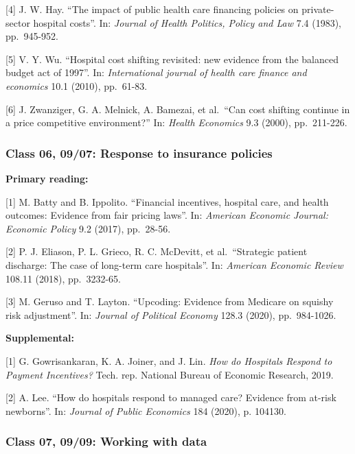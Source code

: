 \documentclass[11pt,]{article}
\begin{document}
{[}4{]} J. W. Hay. ``The impact of public health care financing policies
on private-sector hospital costs''. In: \emph{Journal of Health
Politics, Policy and Law} 7.4 (1983), pp.~945-952.

{[}5{]} V. Y. Wu. ``Hospital cost shifting revisited: new evidence from
the balanced budget act of 1997''. In: \emph{International journal of
health care finance and economics} 10.1 (2010), pp.~61-83.

{[}6{]} J. Zwanziger, G. A. Melnick, A. Bamezai, et al.~``Can cost
shifting continue in a price competitive environment?'' In: \emph{Health
Economics} 9.3 (2000), pp.~211-226.

\hypertarget{class-06-0907-response-to-insurance-policies}{%
\subsubsection{Class 06, 09/07: Response to insurance
policies}\label{class-06-0907-response-to-insurance-policies}}

\textbf{Primary reading:}

{[}1{]} M. Batty and B. Ippolito. ``Financial incentives, hospital care,
and health outcomes: Evidence from fair pricing laws''. In:
\emph{American Economic Journal: Economic Policy} 9.2 (2017), pp.~28-56.

{[}2{]} P. J. Eliason, P. L. Grieco, R. C. McDevitt, et al.~``Strategic
patient discharge: The case of long-term care hospitals''. In:
\emph{American Economic Review} 108.11 (2018), pp.~3232-65.

{[}3{]} M. Geruso and T. Layton. ``Upcoding: Evidence from Medicare on
squishy risk adjustment''. In: \emph{Journal of Political Economy} 128.3
(2020), pp.~984-1026.

\textbf{Supplemental:}

{[}1{]} G. Gowrisankaran, K. A. Joiner, and J. Lin. \emph{How do
Hospitals Respond to Payment Incentives?} Tech. rep. National Bureau of
Economic Research, 2019.

{[}2{]} A. Lee. ``How do hospitals respond to managed care? Evidence
from at-risk newborns''. In: \emph{Journal of Public Economics} 184
(2020), p. 104130.

\hypertarget{class-07-0909-working-with-data}{%
\subsubsection{Class 07, 09/09: Working with
data}\label{class-07-0909-working-with-data}}
\end{document}
